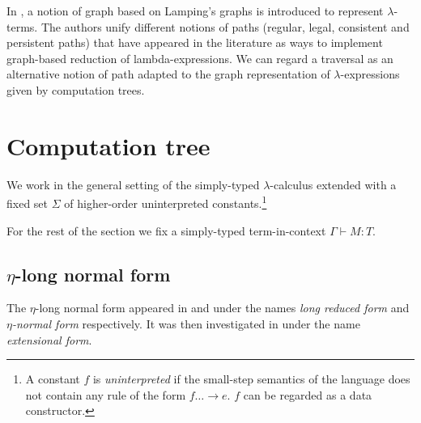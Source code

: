 In \cite{DBLP:conf/lics/AspertiDLR94}, a notion of graph based on Lamping's graphs \citep{lamping} is introduced to represent $\lambda$-terms. The authors unify different notions of paths (regular, legal, consistent and persistent paths) that have appeared in the literature as ways to implement graph-based reduction of lambda-expressions. We can regard a traversal as an alternative notion of path adapted to the graph representation of $\lambda$-expressions given by computation trees.

%

\section{Computation tree}
We work in the general setting of the simply-typed
$\lambda$-calculus extended with a fixed set $\Sigma$ of
higher-order uninterpreted constants.\footnote{A constant $f$ is
  \emph{uninterpreted} if the small-step semantics of the language
  does not contain any rule of the form $f \dots \rightarrow e$. $f$
  can be regarded as a data constructor.}

For the rest of the section we fix a simply-typed term-in-context
$\Gamma \vdash M :T$.

\subsection{\texorpdfstring{$\eta$}{eta}-long normal form}

The $\eta$-long normal form appeared in
\citep{DBLP:journals/tcs/JensenP76} and
\citep{DBLP:journals/tcs/Huet75} under the names \emph{long reduced
form} and \emph{$\eta$-normal form} respectively. It was then
investigated in \citep{huet76} under the name \emph{extensional
form}.

